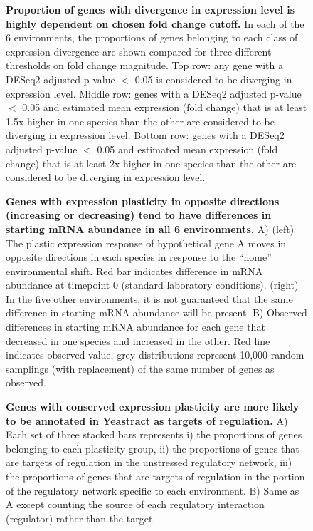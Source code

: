 \begin{figure}
    \centering
    \caption{\textbf{Proportion of genes with divergence in expression level is highly dependent on chosen fold change cutoff.} In each of the 6 environments, the proportions of genes belonging to each class of expression divergence are shown compared for three different thresholds on fold change magnitude. Top row: any gene with a DESeq2 adjusted p-value $<$ 0.05 is considered to be diverging in expression level. Middle row: genes with a DESeq2 adjusted p-value $<$ 0.05 and estimated mean expression (fold change) that is at least 1.5x higher in one species than the other are considered to be diverging in expression level. Bottom row: genes with a DESeq2 adjusted p-value $<$ 0.05 and estimated mean expression (fold change) that is at least 2x higher in one species than the other are considered to be diverging in expression level.}
    \label{fig:threshold}
\end{figure}

\begin{figure}
    \centering
    \caption{\textbf{Genes with expression plasticity in opposite directions (increasing or decreasing) tend to have differences in starting mRNA abundance in all 6 environments.} A) (left) The plastic expression response of hypothetical gene A moves in opposite directions in each species in response to the “home” environmental shift. Red bar indicates difference in mRNA abundance at timepoint 0 (standard laboratory conditions). (right) In the five other environments, it is not guaranteed that the same difference in starting mRNA abundance will be present. B) Observed differences in starting mRNA abundance for each gene that decreased in one species and increased in the other. Red line indicates observed value, grey distributions represent 10,000 random samplings (with replacement) of the same number of genes as observed.}
    \label{fig:tp0}
\end{figure}

\begin{figure}
    \centering
    \caption{\textbf{Genes with conserved expression plasticity are more likely to be annotated in Yeastract as targets of regulation.} A) Each set of three stacked bars represents i) the proportions of genes belonging to each plasticity group, ii) the proportions of genes that are targets of regulation in the unstressed regulatory network, iii) the proportions of genes that are targets of regulation in the portion of the regulatory network specific to each environment. B) Same as A except counting the source of each regulatory interaction (regulator) rather than the target.}
    \label{fig:stackedbars}
\end{figure}



